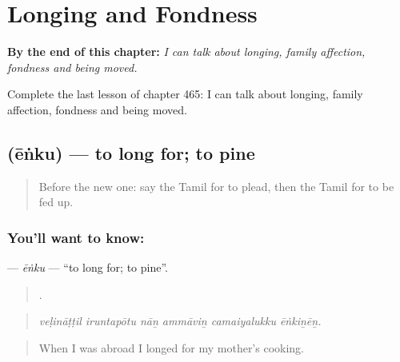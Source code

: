 
\chapter{Longing and Fondness}
\label{ch:ta-longing-and-fondness}

\begin{chapteropening}
\textbf{By the end of this chapter:} \emph{I can talk about longing, family affection, fondness and being moved.}

Complete the last lesson of chapter 465: I can talk about longing, family affection, fondness and being moved.
\end{chapteropening}

\section[\texorpdfstring{\ta{ஏங்கு} (ēṅku)}{ஏங்கு (ēṅku)}]{ (ēṅku) — to long for; to pine}

\label{lesson:TA-C465-enku}



\begin{quote}
Before the new one: say the Tamil for to plead, then the Tamil for to be fed up.
\end{quote}

\subsection*{You'll want to know: }
\textbf{} — \emph{ēṅku} — \textquotedblleft{}to long for; to pine\textquotedblright{}.

\begin{quote}
     .
\end{quote}

\begin{quote}
\emph{veḷināṭṭil iruntapōtu nāṉ ammāviṉ camaiyalukku ēṅkiṉēṉ.}
\end{quote}

\begin{quote}
When I was abroad I longed for my mother’s cooking.
\end{quote}

